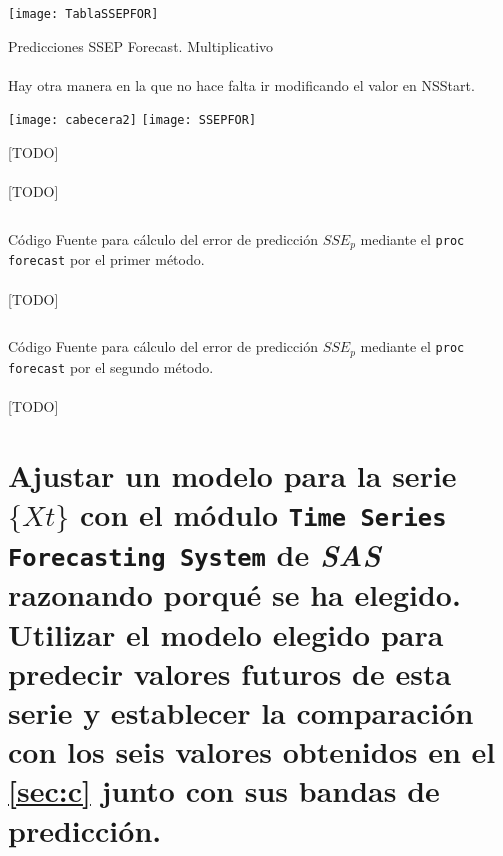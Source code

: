 \documentclass[a4paper, spanish]{article}
\begin{document}
    \begin{table}[htb!]
      \centering
      \texttt{[image: TablaSSEPFOR]}
      \caption{Predicciones SSEP Forecast. Multiplicativo}
      \label{}
    \end{table}

    \paragraph{}
    Hay otra manera en la que no hace falta ir modificando el valor en NSStart.

    \begin{table}[htb!]
      \centering
      \texttt{[image: cabecera2]}
      \texttt{[image: SSEPFOR]}
      \caption{[TODO]}
      \label{}
    \end{table}

    \paragraph{}
    [TODO]

    \begin{listing}[htb!]
      \centering
      \inputminted{SAS}{./res/code/e-prediction-forecast-method-1.sas}
      \caption{Código Fuente para cálculo del error de predicción $SSE_p$ mediante el \texttt{proc forecast} por el primer método.}
      \label{code:prediction_forecast_method_2}
    \end{listing}

    \paragraph{}
    [TODO]

    \begin{listing}[htb!]
      \centering
      \inputminted{SAS}{./res/code/e-prediction-forecast-method-2.sas}
      \caption{Código Fuente para cálculo del error de predicción $SSE_p$ mediante el \texttt{proc forecast} por el segundo método.}
      \label{code:prediction_forecast_method_2}
    \end{listing}

    \paragraph{}
    [TODO]

  \section{Ajustar un modelo para la serie $\{ Xt \}$ con el módulo \texttt{Time Series Forecasting System} de \emph{SAS} razonando porqué se ha elegido. Utilizar el modelo elegido para predecir valores futuros de esta serie y establecer la comparación con los seis valores obtenidos en el \autoref{sec:c} junto con sus bandas de predicción.}
  \label{sec:f}
\end{document}
